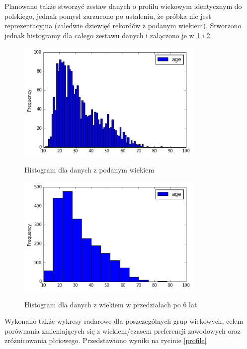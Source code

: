 \documentclass[12pt,a4paper,oneside]{report} %
\begin{document}
Planowano także stworzyć zestaw danych o profilu wiekowym identycznym do polskiego, jednak pomysł zarzucono po ustaleniu, że próbka nie jest reprezentacyjna (zaledwie dziewięć rekordów z podanym wiekiem). Stworzono jednak histogramy dla całego zestawu danych i załączono je w \ref{histo1} i \ref{histo2}. \par

\begin{figure}
\centering
\includegraphics[width=0.8\textwidth]{histo1.png}
\label{histo1}
\caption{Histogram dla danych z podanym wiekiem}
\end{figure}

\begin{figure}
\centering
\includegraphics[width=0.8\textwidth]{histo2.png}
\label{histo2}
\caption{Histogram dla danych z wiekiem w przedziałach po 6 lat}
\end{figure}


Wykonano także wykresy radarowe dla poszczególnych grup wiekowych, celem porównania zmieniających się z wiekiem/czasem 
preferencji zawodowych oraz zróżnicowania płciowego. Przedstawiono wyniki na rycinie \ref{profile} \par
\end{document}
